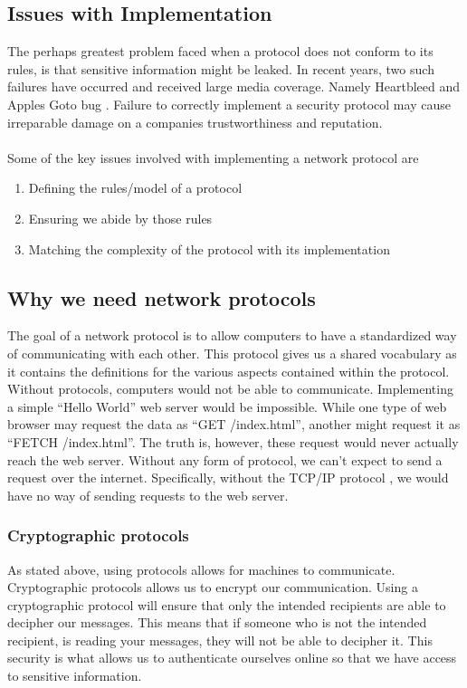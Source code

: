 \subsection{Issues with Implementation}
The perhaps greatest problem faced when a protocol does not conform to its rules, is that sensitive information might be leaked. In recent years, two such failures have occurred and received large media coverage. Namely Heartbleed \cite{durumeric2014matter} and Apples Goto bug \cite{bland2014finding}. Failure to correctly implement a security protocol may  cause irreparable damage on a companies trustworthiness and reputation.
\\\\
Some of the key issues involved with implementing a network protocol are
\begin{enumerate}
  \item Defining the rules/model of a protocol
  \item Ensuring we abide by those rules
  \item Matching the complexity of the protocol with its implementation
\end{enumerate}

\subsection{Why we need network protocols}
The goal of a network protocol is to allow computers to have a standardized way of communicating with each other. This protocol gives us a shared vocabulary as it contains the definitions for the various aspects contained within the protocol. Without protocols, computers would not be able to communicate. Implementing a simple ``Hello World'' web server would be impossible. While one type of web browser may request the data as ``GET /index.html'', another might request it as ``FETCH /index.html''. The truth is, however, these request would never actually reach the web server. Without any form of protocol, we can't expect to send a request over the internet. Specifically, without the TCP/IP protocol \cite{clark1988design}, we would have no way of sending requests to the web server.

\subsubsection{Cryptographic protocols}
As stated above, using protocols allows for machines to communicate. Cryptographic protocols allows us to encrypt our communication. Using a cryptographic protocol will ensure that only the intended recipients are able to decipher our messages. This means that if someone who is not the intended recipient,  is reading your messages, they will not be able to decipher it. This security is what allows us to authenticate ourselves online so that we have access to sensitive information.

